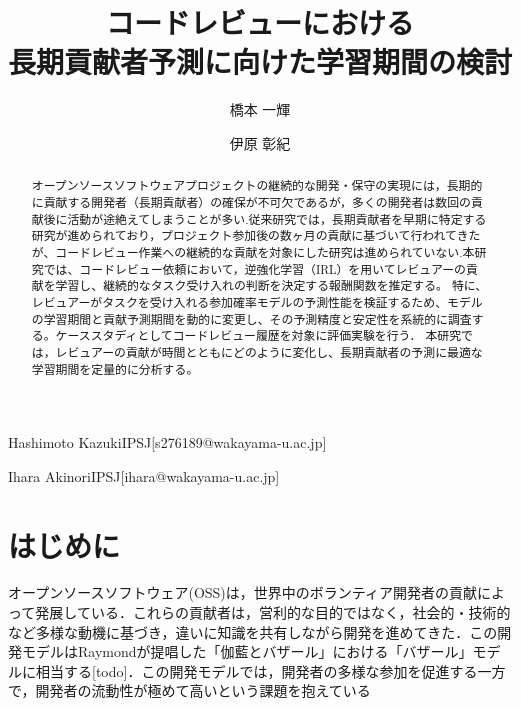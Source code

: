 \documentclass[submit,techrep,noauthor]{ipsj}
\begin{document}
\title{コードレビューにおける\\長期貢献者予測に向けた学習期間の検討}


\author{橋本 一輝}{Hashimoto Kazuki}{IPSJ}[s276189@wakayama-u.ac.jp]
\author{伊原 彰紀}{Ihara Akinori}{IPSJ}[ihara@wakayama-u.ac.jp]


\begin{abstract}
オープンソースソフトウェアプロジェクトの継続的な開発・保守の実現には，長期的に貢献する開発者（長期貢献者）の確保が不可欠であるが，多くの開発者は数回の貢献後に活動が途絶えてしまうことが多い.従来研究では，長期貢献者を早期に特定する研究が進められており，プロジェクト参加後の数ヶ月の貢献に基づいて行われてきたが、コードレビュー作業への継続的な貢献を対象にした研究は進められていない.本研究では、コードレビュー依頼において，逆強化学習（IRL）を用いてレビュアーの貢献を学習し、継続的なタスク受け入れの判断を決定する報酬関数を推定する。
特に、レビュアーがタスクを受け入れる参加確率モデルの予測性能を検証するため、モデルの学習期間と貢献予測期間を動的に変更し、その予測精度と安定性を系統的に調査する。ケーススタディとしてコードレビュー履歴を対象に評価実験を行う．
本研究では，レビュアーの貢献が時間とともにどのように変化し、長期貢献者の予測に最適な学習期間を定量的に分析する。
\end{abstract}


%
%
%

\maketitle

\section{はじめに}
オープンソースソフトウェア(OSS)は，世界中のボランティア開発者の貢献によって発展している．これらの貢献者は，営利的な目的ではなく，社会的・技術的など多様な動機に基づき，違いに知識を共有しながら開発を進めてきた．この開発モデルはRaymondが提唱した「伽藍とバザール」における「バザール」モデルに相当する[todo]．この開発モデルでは，開発者の多様な参加を促進する一方で，開発者の流動性が極めて高いという課題を抱えている
\end{document}
